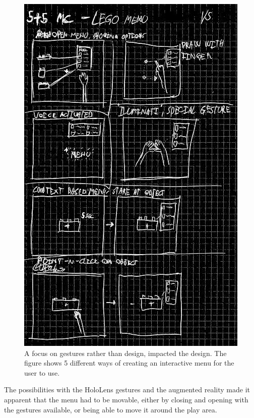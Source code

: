 \begin{figure}[h]
	\centering
	\includegraphics[width=0.7\linewidth]{figures/Menu/menu5}
	\caption{A focus on gestures rather than design, impacted the design. The figure shows 5 different ways of creating an interactive menu for the user to use.}
	\label{fig:menugesture}
\end{figure}
\par
The possibilities with the HoloLens gestures and the augmented reality made it apparent that the menu had to be movable, either by closing and opening with the gestures available, or being able to move it around the play area. 
